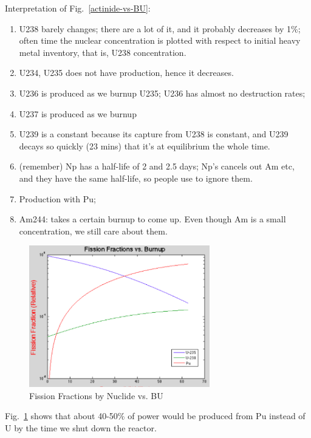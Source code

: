 \documentclass{school-22.211-notes}
\begin{document}
Interpretation of Fig.~\ref{actinide-vs-BU}: 
\begin{enumerate}
\item U238 barely changes; there are a lot of it, and it probably decreases by 1\%; often time the nuclear concentration is plotted with respect to initial heavy metal inventory, that is, U238 concentration. 
\item U234, U235 does not have production, hence it decreases. 
\item U236 is produced as we burnup U235; U236 has almost no destruction rates;
\item U237 is produced as we burnup 
\item U239 is a constant because its capture from U238 is constant, and U239 decays so quickly (23 mins) that it's at equilibrium the whole time. 
\item (remember) Np has a half-life of 2 and 2.5 days; Np's cancels out Am etc, and they have the same half-life, so people use to ignore them. 
\item Production with Pu; 
\item Am244: takes a certain burnup to come up. Even though Am is a small concentration, we still care about them. 
\end{enumerate}
\begin{figure}
  \centering
  \includegraphics[width=0.7\textwidth]{images/dfs/ff-vs-BU.png}
  \caption{Fission Fractions by Nuclide vs. BU} \label{ff-vs-BU}
\end{figure}
Fig.~\ref{ff-vs-BU} shows that about 40-50\% of power would be produced from Pu instead of U by the time we shut down the reactor.
\end{document}
